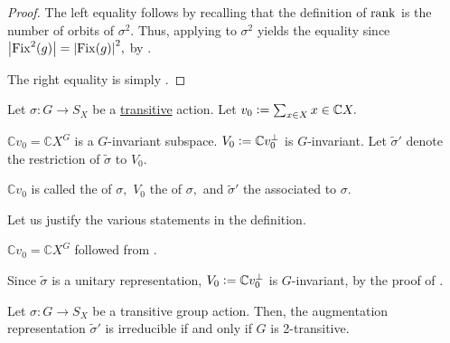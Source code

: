 \begin{proof} 
	The left equality follows by recalling that the definition of $\operatorname{rank}$ is the number of orbits of $\sigma^2.$ Thus, applying  to $\sigma^2$ yields the equality since ${\left\lvert \operatorname{Fix}^2(g) \right\lvert} = {\left\lvert \operatorname{Fix}(g) \right\lvert}^2,$ by .

	The right equality is simply .
\end{proof}

\begin{defn}
	Let $\sigma : G \to S_X$ be a \underline{transitive} action. Let $v_0 \vcentcolon= \sum_{x \in X} x \in \mathbb{C}X.$

	$\mathbb{C}v_0 = \mathbb{C}X^G$ is a $G$-invariant subspace. $V_0 \vcentcolon= \mathbb{C}v_0^\perp$ is $G$-invariant. Let $\widetilde{\sigma}'$ denote the restriction of $\widetilde{\sigma}$ to $V_0.$

	$\mathbb{C}v_0$ is called the  of $\sigma,$ $V_0$ the  of $\sigma,$ and $\widetilde{\sigma}'$ the  associated to $\sigma.$
\end{defn}

\begin{rem}
	Let us justify the various statements in the definition.
	
	$\mathbb{C}v_0 = \mathbb{C}X^G$ followed from .

	Since $\widetilde{\sigma}$ is a unitary representation, $V_0 \vcentcolon= \mathbb{C}v_0^\perp$ is $G$-invariant, by the proof of .
\end{rem}

\begin{thm} \label{thm:augmenirrediff2trans}
	Let $\sigma : G \to S_X$ be a transitive group action. Then, the augmentation representation $\widetilde{\sigma}'$ is irreducible if and only if $G$ is 2-transitive.
\end{thm}

